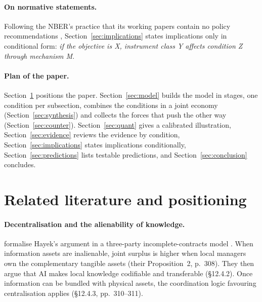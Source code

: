 \documentclass[12pt]{article}
\theoremstyle{remark}
\begin{document}
\paragraph{On normative statements.} Following the NBER's practice that its working papers contain no policy recommendations \citep[resolution reproduced in][front matter]{agrawal2026volume}, Section~\ref{sec:implications} states implications only in conditional form: \emph{if the objective is X, instrument class Y affects condition Z through mechanism M}.

\paragraph{Plan of the paper.} Section~\ref{sec:lit} positions the paper. Section~\ref{sec:model} builds the model in stages, one condition per subsection, combines the conditions in a joint economy (Section~\ref{sec:synthesis}) and collects the forces that push the other way (Section~\ref{sec:counter}). Section~\ref{sec:quant} gives a calibrated illustration, Section~\ref{sec:evidence} reviews the evidence by condition, Section~\ref{sec:implications} states implications conditionally, Section~\ref{sec:predictions} lists testable predictions, and Section~\ref{sec:conclusion} concludes.

\section{Related literature and positioning}\label{sec:lit}

\paragraph{Decentralisation and the alienability of knowledge.} \citet{brynjolfsson2026hayek} formalise Hayek's argument \citep{hayek1945use} in a three-party incomplete-contracts model \citep{grossman1986costs,hart1990property}. When information assets are inalienable, joint surplus is higher when local managers own the complementary tangible assets (their Proposition~2, p.~308). They then argue that AI makes local knowledge codifiable and transferable (\S12.4.2). Once information can be bundled with physical assets, the coordination logic favouring centralisation applies (\S12.4.3, pp.~310--311).
\end{document}
